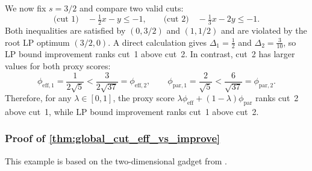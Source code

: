 \documentclass[smallextended,envcountsect]{svjour3} %
\newcommand{\0}{\mathbf{0}}
\newcommand{\1}{\mathbf{1}} %
\begin{document}
We now fix $s=3/2$ and compare two valid cuts:
\[
	\text{(cut 1)}\quad -\tfrac12 x-y\le -1,
	\qquad
	\text{(cut 2)}\quad -\tfrac13 x-2y\le -1.
\]
Both inequalities are satisfied by $(0,3/2)$ and $(1,1/2)$ and are violated by the root LP optimum $(3/2,0)$.
A direct calculation gives $\Delta_1=\tfrac12$ and $\Delta_2=\tfrac{3}{10}$, so LP bound improvement ranks cut~1 above cut~2.
In contrast, cut~2 has larger values for both proxy scores:
\[
	\phi_{\text{eff},1}=\frac{1}{2\sqrt{5}}<\frac{3}{2\sqrt{37}}=\phi_{\text{eff},2},
	\qquad
	\phi_{\text{par},1}=\frac{2}{\sqrt{5}}<\frac{6}{\sqrt{37}}=\phi_{\text{par},2}.
\]
Therefore, for any $\lambda\in[0,1]$, the proxy score $\lambda\phi_{\text{eff}}+(1-\lambda)\phi_{\text{par}}$ ranks cut~2 above cut~1, while LP bound improvement ranks cut~1 above cut~2.


\subsubsection{Proof of \cref{thm:global_cut_eff_vs_improve}}
\label{app:global_cut_eff_vs_improve}

This example is based on the two-dimensional gadget from \citet{shah2025non}.
\end{document}
